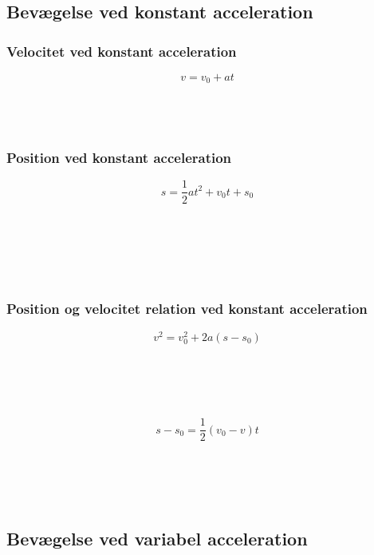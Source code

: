 \subsection{Bevægelse ved konstant acceleration}
	\subsubsection{Velocitet ved konstant acceleration}
		\begin{equation}
			v=v_0+at
		\end{equation}
		\vel\\
		\velbeg\\
		\acc\\
		\tid

	\subsubsection{Position ved konstant acceleration}
		\begin{equation}
			s=\frac{1}{2}at^2+v_0t+s_0
		\end{equation}
		\vel\\
		\velbeg\\
		\acc\\
		\tid\\
		\strek\\
		\strekbeg
		
	\subsubsection{Position og velocitet relation ved konstant acceleration}
		\begin{equation}
			v^2=v_0^2+2a(s-s_0)
		\end{equation}
		\vel\\
		\velbeg\\
		\acc\\
		\strek\\
		\strekbeg

		\begin{equation}
			s-s_0=\frac{1}{2}(v_0-v)t
		\end{equation}
		\vel\\
		\velbeg\\
		\acc\\
		\strek\\
		\strekbeg

\subsection{Bevægelse ved variabel acceleration}
